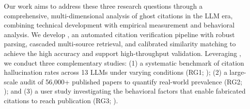 Our work aims to address these three research questions through a comprehensive, multi-dimensional analysis of ghost citations in the LLM era, combining technical development with empirical measurement and behavioral analysis.
We develop \citeb, an automated citation verification pipeline with robust parsing, cascaded multi-source retrieval, and calibrated similarity matching to achieve the high accuracy and support high-throughput validation. Leveraging \citeb, we conduct three complementary studies: (1) a systematic benchmark of citation hallucination rates across 13 LLMs under varying conditions (RG1; ); (2) a large-scale audit of 56,000+ published papers to quantify real-world prevalence (RG2; ); and (3) a user study investigating the behavioral factors that enable fabricated citations to reach publication (RG3; ).
